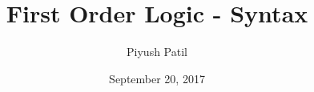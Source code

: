 \documentclass{article}
\begin{document}
\newcommand{\N}{\mathbb{N}}
\newcommand{\Z}{\mathbb{Z}}
\newcommand{\Q}{\mathbb{Q}}
\newcommand{\R}{\mathbb{R}}
\newcommand{\T}{\text{\normalfont\ T}}
\newcommand{\F}{\text{\normalfont\ F}}
\newcommand{\ti}{\textit}
\newcommand{\tb}{\textbf}
\newcommand{\n}{\leavevmode \newline}
\newcommand{\nn}{\leavevmode \newline \newline}
\def \Def#1#2{\begin{adjustwidth}{0.85cm}{0.85cm} \tb{(Definition) #1}: \ti{#2} \end{adjustwidth}}
\def \nDef#1#2{\n \Def{#1}{#2}}
\def \Defn#1#2{\Def{#1}{#2} \n}
\def \nDefn#1#2{\n \Defn{#1}{#2}}
\def \Defcont#1{\begin{adjustwidth}{0.85cm}{0.85cm} \ti{#1} \end{adjustwidth} \n}
\def \InDef#1{\ti{\begin{adjustwidth}{0.85cm}{0.85cm} #1 \end{adjustwidth}}}
\def \Thm#1#2{\begin{adjustwidth}{0.85cm}{0.85cm} \tb{(Theorem) #1}: \ti{#2} \end{adjustwidth}}
\def \nThm#1#2{\n \Thm{#1}{#2}}
\def \Thmn#1#2{\Thm{#1}{#2} \n}
\def \nThmn#1#2{\n \Thmn{#1}{#2}}
\def \InThm#1{\ti{\begin{adjustwidth}{0.85cm}{0.85cm} #1 \end{adjustwidth}}}
\def \Pf#1{\begin{adjustwidth}{0.85cm}{0.85cm} \textit{Proof}: #1 \qedsymbol \end{adjustwidth} \n}
\newcommand{\st}{\textnormal{ s.t. }}
\newcommand{\proplang}{\mathcal{L}_0}
\newcommand{\predlang}{\mathcal{L}}

\title{First Order Logic - Syntax}
\author{Piyush Patil}
\date{September 20, 2017}
\maketitle
\end{document}
